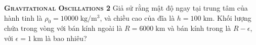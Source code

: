 \begin{problem}
\textbf{\textsc{Gravitational Oscillations 2}} Giả sử rằng mật độ ngay tại trung tâm của hành tinh là \(\rho_0=10000 \; \mathrm{kg/m^3}\), và chiều cao của đĩa là $h = 100 \; \mathrm{km}$. Khối lượng chứa trong vòng với bán kính ngoài là \(R = 6000 \; \mathrm{km}\) và bán kính trong là \(R - \epsilon\), với $\epsilon=1 \; \mathrm{km}$ là bao nhiêu?
    
\end{problem}
